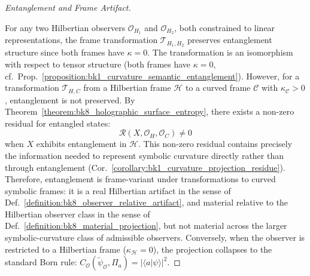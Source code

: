 \begin{proof}[Entanglement and Frame Artifact]
\label{proof:bk8_entanglement_as_frame_artifact}
\leavevmode

For any two Hilbertian observers $\mathcal{O}_{H_1}$ and $\mathcal{O}_{H_2}$, both constrained to linear representations, the frame transformation $\mathcal{T}_{H_1, H_2}$ preserves entanglement structure since both frames have $\kappa = 0$. The transformation is an isomorphism with respect to tensor structure (both frames have $\kappa=0$, cf.~Prop.~\ref{proposition:bk1_curvature_semantic_entanglement}).
However, for a transformation $\mathcal{T}_{H,C}$ from a Hilbertian frame $\mathcal{H}$ to a curved frame $\mathcal{C}$ with $\kappa_{\mathcal{C}} > 0$, entanglement is not preserved. By Theorem~\ref{theorem:bk8_holographic_surface_entropy}, there exists a non-zero residual for entangled states:
\begin{equation}
\mathcal{R}(X, \mathcal{O}_H, \mathcal{O}_C) \neq 0
\end{equation}
when $X$ exhibits entanglement in $\mathcal{H}$.
This non-zero residual contains precisely the information needed to represent symbolic curvature directly rather than through entanglement (Cor.~\ref{corollary:bk1_curvature_projection_residue}). Therefore, entanglement is frame-variant under transformations to curved symbolic frames: it is a real Hilbertian artifact in the sense of Def.~\ref{definition:bk8_observer_relative_artifact}, and material relative to the Hilbertian observer class in the sense of Def.~\ref{definition:bk8_material_projection}, but not material across the larger symbolic-curvature class of admissible observers. Conversely, when the observer is restricted to a Hilbertian frame ($\kappa_{\mathcal{H}}=0$), the projection collapses to the standard Born rule: $C_{\mathcal{O}}(\tilde\psi_{\mathcal{O}},\Pi_a)=|\langle a|\psi\rangle|^2$.
\end{proof}

